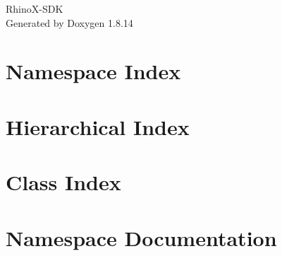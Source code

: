 \documentclass[twoside]{book}
\newcommand{\+}{\discretionary{\mbox{\scriptsize$\hookleftarrow$}}{}{}}
\newcommand{\clearemptydoublepage}{%
  \newpage{\pagestyle{empty}\cleardoublepage}%
}
\begin{document}
\hypersetup{pageanchor=false,
             bookmarksnumbered=true,
             pdfencoding=unicode
            }
\begin{titlepage}
\vspace*{7cm}
\begin{center}%
{\Large Rhino\+X-\/\+S\+DK }\\
\vspace*{1cm}
{\large Generated by Doxygen 1.8.14}\\
\end{center}
\end{titlepage}
\clearemptydoublepage
{}
\tableofcontents
\clearemptydoublepage
{}
\hypersetup{pageanchor=true}

\chapter{Namespace Index}

\chapter{Hierarchical Index}

\chapter{Class Index}

\chapter{Namespace Documentation}



\end{document}

